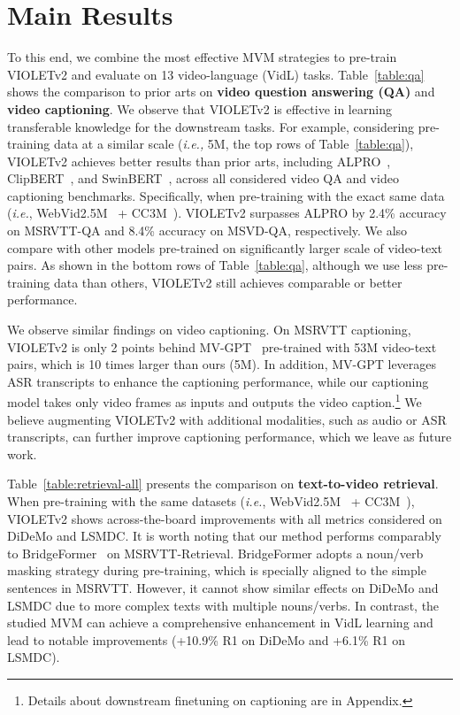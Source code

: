 \documentclass[10pt,twocolumn,letterpaper]{article}
\newcommand{\modelname}{VIOLETv2\xspace}
\begin{document}
\section{Main Results} \label{sec:sota}
To this end, we combine the most effective MVM strategies to pre-train \modelname and evaluate on 13 video-language (VidL) tasks. Table~\ref{table:qa} shows the comparison to prior arts on \textbf{video question answering (QA)} and \textbf{video captioning}. We observe that \modelname is effective in learning transferable knowledge for the downstream tasks. For example, considering pre-training data at a similar scale (\textit{i.e.,}  5M, the top rows of Table~\ref{table:qa}), \modelname achieves better results than prior arts, including ALPRO~\cite{li2022alpro}, ClipBERT~\cite{lei2021clip-bert}, and SwinBERT~\cite{lin2022swin-bert}, across all considered video QA and video captioning benchmarks. Specifically, when pre-training with the exact same data (\textit{i.e.}, WebVid2.5M~\cite{bain2021frozen} + CC3M~\cite{sharma2018cc}). \modelname surpasses ALPRO by 2.4\% accuracy on MSRVTT-QA and 8.4\% accuracy on MSVD-QA, respectively.
We also compare with other models pre-trained on significantly larger scale of video-text pairs. As shown in the bottom rows of Table~\ref{table:qa}, although we use less pre-training data than others, \modelname still achieves comparable or better performance. 

We observe similar findings on video captioning. On MSRVTT captioning, \modelname is only 2 points behind MV-GPT~\cite{seo2022mv-gpt} pre-trained with 53M video-text  pairs, which is 10 times larger than ours (5M). In addition, MV-GPT leverages ASR transcripts to enhance the captioning performance, while our captioning model takes only video frames as inputs and outputs the video caption.\footnote{Details about downstream finetuning on captioning are in Appendix.} 
We believe augmenting \modelname with additional modalities, such as audio or ASR transcripts, can further improve captioning performance, which we leave as future work.

Table~\ref{table:retrieval-all} presents the comparison on \textbf{text-to-video retrieval}. When pre-training with the same datasets (\textit{i.e.}, WebVid2.5M~\cite{bain2021frozen} + CC3M~\cite{sharma2018cc}), \modelname shows across-the-board improvements with all metrics considered on DiDeMo and LSMDC. It is worth noting that our method performs comparably to BridgeFormer~\cite{ge2022bridge-former} on MSRVTT-Retrieval. BridgeFormer adopts a noun/verb masking strategy during pre-training, which is specially aligned to the simple sentences in MSRVTT. However, it cannot show similar effects on DiDeMo and LSMDC due to more complex texts with multiple nouns/verbs. In contrast, the studied MVM can achieve a comprehensive enhancement in VidL learning and lead to notable improvements (+10.9\% R1 on DiDeMo and +6.1\% R1 on LSMDC).
\end{document}
